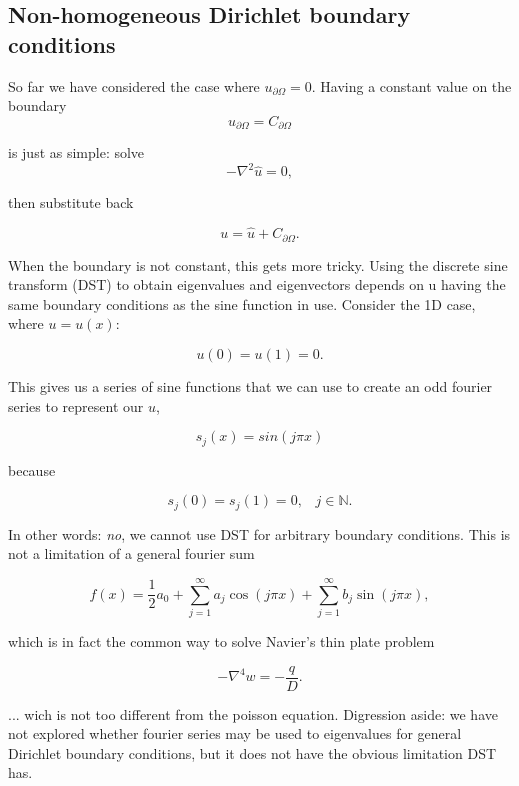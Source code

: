 \subsection{Non-homogeneous Dirichlet boundary conditions}
So far we have considered the case where $u_{\partial \Omega} = 0$. Having a constant value on the boundary
\begin{equation}
  u_{\partial \Omega} = C_{\partial \Omega}
\end{equation}

is just as simple: solve
\begin{equation}	
-\nabla^2 \hat{u} = 0,
\end{equation}

then substitute back

\begin{equation}	
u = \hat{u} + C_{\partial \Omega}.
\end{equation}

When the boundary is not constant, this gets more tricky. Using the discrete sine transform (DST) to obtain eigenvalues and eigenvectors depends on u having the same boundary conditions as the sine function in use. Consider the 1D case, where $u = u(x)$:

\begin{equation}
	u(0) = u(1) = 0.
\end{equation}

This gives us a series of sine functions that we can use to create an odd fourier series to represent our $u$,

\begin{equation}
	s_j(x) = sin\left(j \pi x\right)
\end{equation}

because

\begin{equation}
	s_j(0) = s_j(1) = 0, \;\;\; j \in \mathbb{N}.
\end{equation}

In other words: \emph{no}, we cannot use DST for arbitrary boundary conditions. This is not a limitation of a general fourier sum

\begin{equation}
	f(x) = \frac{1}{2} a_0
		+ \sum_{j=1}^{\infty} a_j \cos(j \pi x)
		+ \sum_{j=1}^{\infty} b_j \sin(j \pi x)
		,
\end{equation}

which is in fact the common way to solve Navier's thin plate problem

\begin{equation}
-\nabla^4 w = -\frac{q}{D}.
\end{equation}

... wich is not too different from the poisson equation. Digression aside: we have not explored whether fourier series may be used to eigenvalues for general Dirichlet boundary conditions, but it does not have the obvious limitation DST has.
